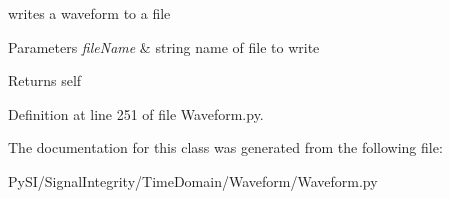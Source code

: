 writes a waveform to a file 


\begin{DoxyParams}{Parameters}
{\em file\+Name} & string name of file to write \\
\hline
\end{DoxyParams}
\begin{DoxyReturn}{Returns}
self 
\end{DoxyReturn}


Definition at line 251 of file Waveform.\+py.



The documentation for this class was generated from the following file\+:\begin{DoxyCompactItemize}
\item 
Py\+S\+I/\+Signal\+Integrity/\+Time\+Domain/\+Waveform/Waveform.\+py\end{DoxyCompactItemize}
